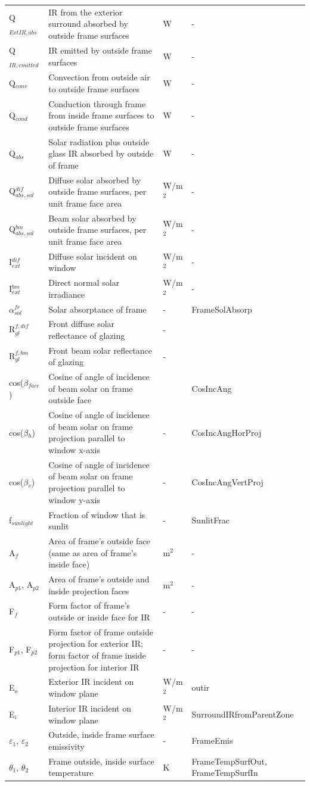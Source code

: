 \begin{longtable}[c]{p{1.0in}p{2.5in}p{1.0in}p{1.5in}}
Q\(_{ExtIR,abs}\) & IR from the exterior surround absorbed by outside frame surfaces & W & - \tabularnewline
Q\(_{IR,emitted}\) & IR emitted by outside frame surfaces & W & - \tabularnewline
Q\(_{conv}\) & Convection from outside air to outside frame surfaces & W & - \tabularnewline
Q\(_{cond}\) & Conduction through frame from inside frame surfaces to outside frame surfaces & W & - \tabularnewline
Q\(_{abs}\) & Solar radiation plus outside glass IR absorbed by outside of frame & W & - \tabularnewline
Q\(^{dif}_{abs,sol}\) & Diffuse solar absorbed by outside frame surfaces, per unit frame face area & W/m\(^{2}\) & - \tabularnewline
Q\(^{bm}_{abs,sol}\) & Beam solar absorbed by outside frame surfaces, per unit frame face area & W/m\(^{2}\) & - \tabularnewline
I\(^{dif}_{ext}\) & Diffuse solar incident on window & W/m\(^{2}\) & - \tabularnewline
I\(^{bm}_{ext}\) & Direct normal solar irradiance & W/m\(^{2}\) & - \tabularnewline
$\alpha$\(^{fr}_{sol}\) & Solar absorptance of frame & - & FrameSolAbsorp \tabularnewline
R\(_{gl}^{f,dif}\) & Front diffuse solar reflectance of glazing & - & ~ \tabularnewline
R\(_{gl}^{f,bm}\) & Front beam solar reflectance of glazing & - & ~ \tabularnewline
cos($\beta$\(_{face}\)) & Cosine of angle of incidence of beam solar on frame outside face & ~ & CosIncAng \tabularnewline
cos($\beta$\(_{h}\)) & Cosine of angle of incidence of beam solar on frame projection parallel to window x-axis & - & CosIncAngHorProj \tabularnewline
cos($\beta$\(_{v}\)) & Cosine of angle of incidence of beam solar on frame projection parallel to window y-axis & - & CosIncAngVertProj \tabularnewline
f\(_{sunlight}\) & Fraction of window that is sunlit & - & SunlitFrac \tabularnewline
A\(_{f}\) & Area of frame’s outside face (same as area of frame’s inside face) & m\(^{2}\) & - \tabularnewline
A\(_{p1}\), A\(_{p2}\) & Area of frame’s outside and inside projection faces & m\(^{2}\) & - \tabularnewline
F\(_{f}\) & Form factor of frame’s outside or inside face for IR & - & - \tabularnewline
F\(_{p1}\), F\(_{p2}\) & Form factor of frame outside projection for exterior IR; form factor of frame inside projection for interior IR & - & - \tabularnewline
E\(_{o}\) & Exterior IR incident on window plane & W/m\(^{2}\) & outir \tabularnewline
E\(_{i}\) & Interior IR incident on window plane & W/m\(^{2}\) & SurroundIRfromParentZone \tabularnewline
$\varepsilon$\(_{1}\), $\varepsilon$\(_{2}\) & Outside, inside frame surface emissivity & - & FrameEmis \tabularnewline
$\theta$\(_{1}\), $\theta$\(_{2}\) & Frame outside, inside surface temperature & K & FrameTempSurfOut, FrameTempSurfIn \tabularnewline

\end{longtable}
